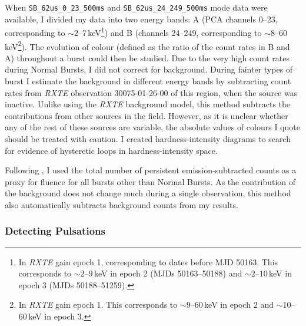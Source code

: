 \par When \texttt{SB\_62us\_0\_23\_500ms} and \texttt{SB\_62us\_24\_249\_500ms} mode data were available, I divided my data into two energy bands: A (PCA channels 0--23, corresponding to $\sim2$--$7$\,keV\footnote{In \textit{RXTE} gain epoch 1, corresponding to dates before MJD 50163.  This corresponds to $\sim2$--$9$\,keV in epoch 2 (MJDs 50163--50188) and $\sim2$--$10$\,keV in epoch 3 (MJDs 50188--51259).}) and B (channels 24--249, corresponding to $\sim8$--$60$\,keV\footnote{In \textit{RXTE} gain epoch 1.  This corresponds to $\sim9$--$60$\,keV in epoch 2 and $\sim10$--$60$\,keV in epoch 3.}).  The evolution of colour (defined as the ratio of the count rates in B and A) throughout a burst could then be studied.  Due to the very high count rates during Normal Bursts, I did not correct for background.  During fainter types of burst I estimate the background in different energy bands by subtracting count rates from \textit{RXTE} observation 30075-01-26-00 of this region, when the source was inactive.  Unlike using the \textit{RXTE} background model, this method subtracts the contributions from other sources in the field.  However, as it is unclear whether any of the rest of these sources are variable, the absolute values of colours I quote should be treated with caution.  I created hardness-intensity diagrams to search for evidence of hysteretic loops in hardness-intensity space.
\par Following \citet{Bagnoli_PopStudy}, I used the total number of persistent emission-subtracted counts as a proxy for fluence for all bursts other than Normal Bursts.  As the contribution of the background does not change much during a single observation, this method also automatically subtracts background counts from my results.

\subsubsection{Detecting Pulsations}

